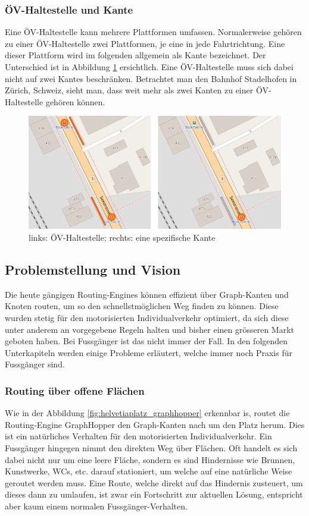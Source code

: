 \subsubsection{ÖV-Haltestelle und Kante}
\label{ÖV-Haltestelle und Kante}
Eine ÖV-Haltestelle kann mehrere Plattformen umfassen. Normalerweise gehören zu einer ÖV-Haltestelle zwei Plattformen, je eine in jede Fahrtrichtung. Eine dieser Plattform wird im folgenden allgemein als Kante bezeichnet. Der Unterschied ist in Abbildung \ref{fig:public_transport_stop} ersichtlich. Eine ÖV-Haltestelle muss sich dabei nicht auf zwei \glspl{Kante} beschränken. Betrachtet man den Bahnhof Stadelhofen in Zürich, Schweiz, sieht man, dass weit mehr als zwei Kanten zu einer ÖV-Haltestelle gehören können.

\begin{figure}[ht]
\centering
\includegraphics[width=0.7\linewidth]{technicalreport/img/public_transport_stop}
\caption[Unterschied ÖV-Haltestelle und Kante]{links: ÖV-Haltestelle; rechts: eine spezifische Kante}
\label{fig:public_transport_stop}
\end{figure}


\subsection{Problemstellung und Vision}
\label{Problemstellung und Vision}
Die heute gängigen \glspl{Routing-Engine} können effizient über Graph-Kanten und Knoten routen, um so den schnellstmöglichen Weg finden zu können. Diese wurden stetig für den motorisierten Individualverkehr optimiert, da sich diese unter anderem an vorgegebene Regeln halten und bisher einen grösseren Markt geboten haben. Bei Fussgänger ist das nicht immer der Fall. In den folgenden Unterkapiteln werden einige Probleme erläutert, welche immer noch Praxis für Fussgänger sind.

\subsubsection{Routing über offene Flächen}
\label{problem:Routing über offene Flächen}
Wie in der Abbildung \ref{fig:helvetiaplatz_graphhopper} erkennbar is, routet die Routing-Engine GraphHopper \cite{graphhopper} den Graph-Kanten nach um den Platz herum. Dies ist ein natürliches Verhalten für den motorisierten Individualverkehr. Ein Fussgänger hingegen nimmt den direkten Weg über Flächen. Oft handelt es sich dabei nicht nur um eine leere Fläche, sondern es sind Hindernisse wie Brunnen, Kunstwerke, WCs, etc. darauf stationiert, um welche auf eine natürliche Weise geroutet werden muss. Eine Route, welche direkt auf das Hindernis zusteuert, um dieses dann zu umlaufen, ist zwar ein Fortschritt zur aktuellen Lösung, entspricht aber kaum einem normalen Fussgänger-Verhalten. 

